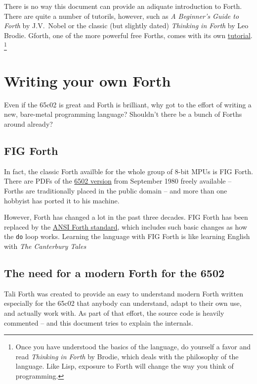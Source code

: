 There is no way this document can provide an adiquate introduction to Forth.
There are quite a number of tutorils, however, such as \textit{A Beginner's
Guide to Forth} by J.V.~Nobel\cite{nobel} or the classic (but slightly dated)
\textit{Thinking in Forth}\cite{brodie03} by Leo Brodie.
Gforth, one of the more powerful free Forths, comes with its own
\href{http://www.complang.tuwien.ac.at/forth/gforth/Docs-html/Tutorial.html}{tutorial}.
\footnote{Once you have understood the basics of the language, do yourself a
favor and read \textit{Thinking in Forth} by Brodie\cite{brodie84}, which deals with the philosophy of the language. Like Lisp,
exposure to Forth will change the way you think of programming.} 


\section{Writing your own Forth}

Even if the 65c02 is great and Forth is brilliant, why got to the effort of
writing a new, bare-metal programming language? Shouldn't there be a bunch of
Forths around already?


\subsection{FIG Forth}

In fact, the classic Forth availble for the whole group of 8-bit MPUs is FIG
Forth. There are PDFs of the
\href{http://www.forth.org/fig-forth/fig-forth\_6502.pdf}{6502 version} from
September 1980 freely available -- Forths are traditionally placed in the public
domain -- and more than one hobbyist has ported it to his machine. 

However, Forth has changed a lot in the past three decades. FIG Forth has been
replaced by the \href{https://forth-standard.org/}{ANSI Forth
standard}, which includes such basic changes as how the
\texttt{do} loop works. Learning the language with FIG Forth is like learning
English with \textit{The Canterbury Tales}


\subsection{The need for a modern Forth for the 6502}

Tali Forth was created to provide an easy to understand modern Forth written
especially for the 65c02 that anybody can understand, adapt to their own use,
and actually work with. As part of that effort, the source code is heavily
commented -- and this document tries to explain the internals.


